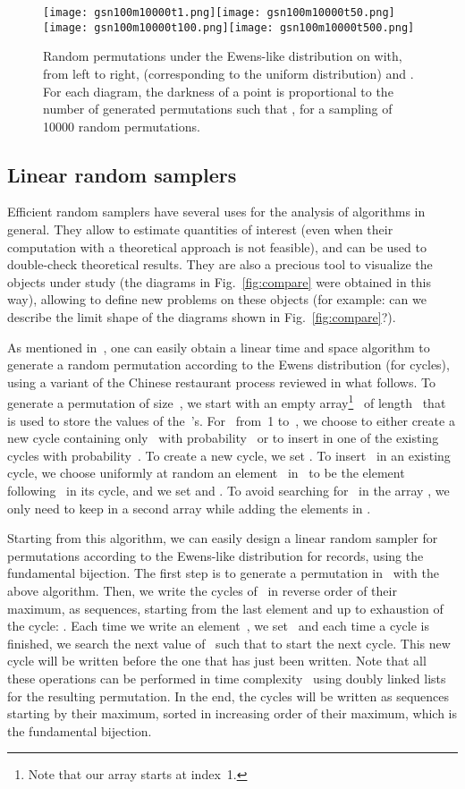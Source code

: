 \documentclass[proceedings]{aofa}
\begin{document}
\begin{figure}[ht]
\texttt{[image: gsn100m10000t1.png]}\texttt{[image: gsn100m10000t50.png]}\texttt{[image: gsn100m10000t100.png]}\texttt{[image: gsn100m10000t500.png]}
\caption{Random permutations under the Ewens-like distribution on  with, from left to right,  (corresponding to the uniform distribution) and . For each diagram,  the darkness of a point  is proportional 
to the number of generated permutations  such that , for a sampling of 10000 random permutations.\label{fig:Ewens}}
\end{figure}

\subsection{Linear random samplers}
Efficient random samplers have several uses for the analysis of algorithms in general. 
They allow to estimate quantities of interest (even when their computation with a theoretical approach is not feasible), 
and can be used to double-check theoretical results. 
They are also a precious tool to visualize the objects under study (the diagrams in Fig.~\ref{fig:compare} were obtained in this way), 
allowing to define new problems on these objects (for example: can we describe the limit shape of the diagrams shown in Fig.~\ref{fig:compare}?).

As mentioned in~\cite[\S 2.1]{Valentin}, one can easily obtain a linear time and space algorithm to generate a random permutation according to the Ewens distribution (for cycles), using a variant of the Chinese restaurant process reviewed in what follows. 
To generate a permutation of size~, we start with an empty array\footnote{Note that our array starts at index~1.}~ of length~ that is used to store the values of the~'s. For~ from~1 to~, we choose to either create a new cycle containing only~ with probability~ or to insert  in one of the existing cycles with probability~. To create a new cycle, we set . To insert~ in an existing cycle, we choose uniformly at random an element~ in~ to be the element following~ in its cycle, and we set  and . To avoid searching for~ in the array , we only need to keep  in a second array while adding the elements in .

Starting from this algorithm, we can easily design a linear random sampler for permutations according to the Ewens-like distribution for records, using the fundamental bijection. The first step is to generate a permutation  in~ with the above algorithm. Then, we write the cycles of~ in reverse order of their maximum, as sequences, starting from the last element and up to exhaustion of the cycle: . Each time we write an element~, we set~ and each time a cycle is finished, we search the next value of~ such that  to start the next cycle. This new cycle will be written before the one that has just been written. Note that all these operations can be performed in time complexity~ using doubly linked lists for the resulting permutation. In the end, the cycles will be written as sequences starting by their maximum, sorted in increasing order of their maximum, which is the fundamental bijection.
\end{document}
